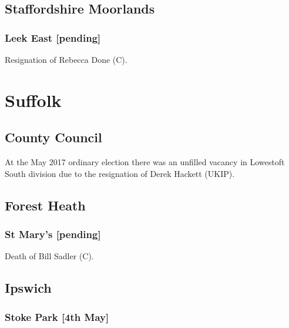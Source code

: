 \documentclass[a4paper,openany]{book}
\begin{document}
\begin{resultsiii}
\subsection*{Staffordshire Moorlands}

\subsubsection*{Leek East \hspace*{\fill}\nolinebreak[1]%
\enspace\hspace*{\fill}
[pending]}


Resignation of Rebecca Done (C).

\section{Suffolk}

\subsection*{County Council}

At the May 2017 ordinary election there was an unfilled vacancy in Lowestoft South division due to the resignation of Derek Hackett (UKIP).

\subsection*{Forest Heath}

\subsubsection*{St Mary's \hspace*{\fill}\nolinebreak[1]%
\enspace\hspace*{\fill}
[pending]}


Death of Bill Sadler (C).

\subsection*{Ipswich}

\subsubsection*{Stoke Park \hspace*{\fill}\nolinebreak[1]%
\enspace\hspace*{\fill}
[4th May]}


\end{resultsiii}
\end{document}
